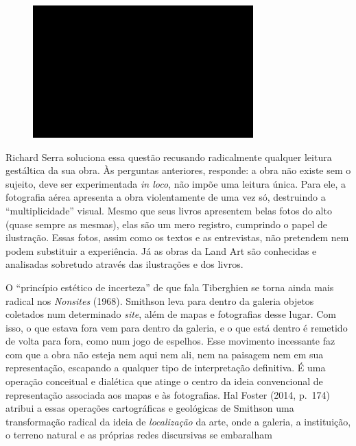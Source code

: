 \begin{figure}[!ht]

\centering
 \includegraphics[width=85mm]{./imgs/im1.jpg}
\caption{\tiny{}}

\end{figure}

Richard Serra soluciona essa questão recusando radicalmente qualquer
leitura gestáltica da sua obra. Às perguntas anteriores, responde: a
obra não existe sem o sujeito, deve ser experimentada \emph{in loco},
não impõe uma leitura única. Para ele, a fotografia aérea apresenta a
obra violentamente de uma vez só, destruindo a ``multiplicidade''
visual. Mesmo que seus livros apresentem belas fotos do alto (quase
sempre as mesmas), elas são um mero registro, cumprindo o papel de
ilustração. Essas fotos, assim como os textos e as entrevistas, não
pretendem nem podem substituir a experiência. Já as obras da Land Art
são conhecidas e analisadas sobretudo através das ilustrações e dos
livros.

O ``princípio estético de incerteza'' de que fala Tiberghien se torna
ainda mais radical nos \emph{Nonsites} (1968). Smithson leva para dentro
da galeria objetos coletados num determinado \emph{site}, além de mapas
e fotografias desse lugar. Com isso, o que estava fora vem para dentro
da galeria, e o que está dentro é remetido de volta para fora, como num
jogo de espelhos. Esse movimento incessante faz com que a obra não
esteja nem aqui nem ali, nem na paisagem nem em sua representação,
escapando a qualquer tipo de interpretação definitiva. É uma operação
conceitual e dialética que atinge o centro da ideia convencional de
representação associada aos mapas e às fotografias. Hal Foster (2014, p.~174) atribui a essas operações cartográficas e geológicas de Smithson
uma transformação radical da ideia de \emph{localização} da arte, onde a
galeria, a instituição, o terreno natural e as próprias redes discursivas
se embaralham

